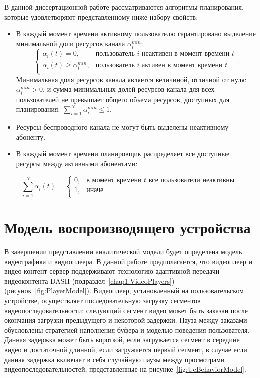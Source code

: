 В данной диссертационной работе рассматриваются алгоритмы планирования, которые удовлетворяют представленному ниже набору свойств:
\begin{itemize}
	\item В каждый момент времени активному пользователю гарантировано выделение минимальной доли ресурсов канала $\alpha_{i}^{min}$:
	\begin{equation}
		\label{eq:MinGuarPart}
		\begin{cases}
			\alpha_i(t) = 0, & \text{пользователь $i$ неактивен в момент времени $t$} \\
			\alpha_i(t) \geq \alpha_{i}^{min}, & \text{пользователь $i$ активен в момент времени $t$}\\
		\end{cases}.
	\end{equation}
	Минимальная доля ресурсов канала является величиной, отличной от нуля: $\alpha_{i}^{min} > 0$, и сумма минимальных долей ресурсов канала для всех пользователей не превышает общего объема ресурсов, доступных для планирования: $\sum\limits_{i=1}^{N}\alpha_{i}^{min} \leq 1$.
	\item Ресурсы беспроводного канала не могут быть выделены неактивному абоненту.
	\item В каждый момент времени планировщик распределяет все доступные ресурсы между активными абонентами:
\end{itemize}
\begin{equation}
	\label{eq:AllResources}
	\sum\limits_{i=1}^{N}\alpha_{i}(t) =
	\begin{cases}
		0, & \text{в момент времени $t$ все пользователи неактивны} \\
		1, & \text{иначе}\\
	\end{cases}.
\end{equation}

\section{Модель воспроизводящего устройства}
\label{chap2:VideoTrafficModel}

В завершении представлении аналитической модели будет определена модель видеотрафика и видиоплеера. В данной работе предполагается, что видеоплеер и видео контент сервер поддерживают технологию адаптивной передачи видеоконтента DASH (подраздел~\ref{chap1:VideoPlayers}) (рисунок~\ref{fig:PlayerModel}). Видеоплеер, установленный на пользовательском устройстве, осуществляет последовательную загрузку сегментов видеопоследовательности: следующий сегмент видео может быть заказан после окончания загрузки предыдущего и некоторой задержки. Пауза между заказами обусловлены стратегией наполнения буфера и моделью поведения пользователя. Данная задержка может быть короткой, если загружается сегмент в середине видео и достаточной длинной, если загружается первый сегмент, в случае если данная задержка включает в себя случайную паузы между просмотрами видеопоследовательностей, представленные на рисунке~\ref{fig:UeBehaviorModel}.

